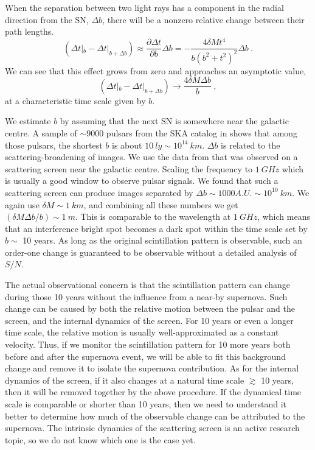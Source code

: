 \documentclass[aps,showpacs,onecolumn,floats,prd,superscriptaddress,nofootinbib]{revtex4-1}
\begin{document}
When the separation between two light rays has a component in the radial direction from the SN, $\Delta b$, there will be a nonzero relative change between their path lengths.
\begin{equation}
	(\Delta t|_b - \Delta t|_{b+\Delta b}) \approx 
	\frac{\partial \Delta t}{\partial b} \Delta b 
	= - \frac{4\delta Mt^4}{b(b^2 + t^2)^2} \Delta b~.
	\label{eq-change}
\end{equation}
We can see that this effect grows from zero and approaches an asymptotic value,
\begin{equation}
	(\Delta t|_b - \Delta t|_{b+\Delta b}) 
	\longrightarrow \frac{4\delta M \Delta b}{b}~,	\label{pulsescint}
\end{equation}
at a characteristic time scale given by $b$.

We estimate $b$ by assuming that the next SN is somewhere near the galactic centre. 
A sample of $\sim 9000$ pulsars from the SKA catalog in \cite{MSPpopulation} shows that among those pulsars, the shortest $b$ is about $10\ ly \sim 10^{14} \ km$. 
$\Delta b$ is related to the scattering-broadening of images. 
We use the data from \cite{BowBel13} that was observed on a scattering screen near the galactic centre. 
Scaling the frequency to $1\ GHz$ which is usually a good window to observe pulsar signals. 
We found that such a scattering screen can produce images separated by $\Delta b\sim 1000A.U. \sim 10^{10} \ km$. 
We again use $\delta M \sim 1 \ km$, and combining all these numbers we get $(\delta M \Delta b / b) \sim 1 \ m$. 
This is comparable to the wavelength at $1 \ GHz$, which means that an interference bright spot becomes a dark spot within the time scale set by $b\sim$ 10 years. 
As long as the original scintillation pattern is observable, such an order-one change is guaranteed to be observable without a detailed analysis of $S/N$.

The actual observational concern is that the scintillation pattern can change during those 10 years without the influence from a near-by supernova.
Such change can be caused by both the relative motion between the pulsar and the screen, and the internal dynamics of the screen.
For 10 years or even a longer time scale, the relative motion is usually well-approximated as a constant velocity.
Thus, if we monitor the scintillation pattern for 10 more years both before and after the supernova event, we will be able to fit this background change and remove it to isolate the supernova contribution.
As for the internal dynamics of the screen, if it also changes at a natural time scale $\gtrsim$ 10 years, then it will be removed together by the above procedure.
If the dynamical time scale is comparable or shorter than 10 years, then we need to understand it better to determine how much of the observable change can be attributed to the supernova.
The intrinsic dynamics of the scattering screen is an active research topic, so we do not know which one is the case yet.
\end{document}
